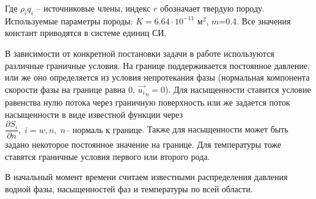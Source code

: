 Где $\rho_i q_i$ -- источниковые члены, индекс $r$ обозначает твердую породу.
Используемые параметры породы: $K=6.64\cdot 10^{-11}$ м$^2$, $m$=0.4.
Все значения констант приводятся в системе единиц СИ.

В зависимости от конкретной постановки задачи в работе используются различные
граничные условия. На границе поддерживается постоянное давление, или же оно
определяется из условия непротекания фазы (нормальная компонента скорости
фазы на границе равна 0, $\overrightarrow{u_i}_{n} = 0$).
Для насыщенности ставится условие равенства нулю потока через граничную 
поверхность или же задается поток насыщенности в виде известной функции через 
$ \dfrac{\partial S_i}{\partial n}, \; i=w,n, \;  n \text{-- нормаль к границе} $.
Также для насыщенности может быть задано некоторое постоянное значение на границе.
Для температуры тоже ставятся граничные условия первого или второго рода. 

В начальный момент времени считаем известными распределения давления водной 
фазы, насыщенностей фаз и температуры по всей области.
